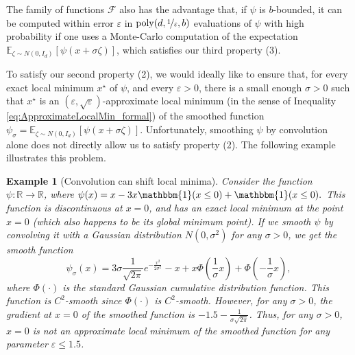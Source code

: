 \documentclass[11pt,letterpaper]{article}
\renewcommand{\epsilon}{\varepsilon}
\newtheorem{example}[theorem]{Example}
\newcommand{\eps}{\varepsilon}
\begin{document}
The family of functions $\mathcal{F}$ also has the advantage that, if $\psi$ is $b$-bounded, it can be computed within error $\epsilon$ in $\mathrm{poly}(d,\nicefrac{1}{\epsilon}, b)$ evaluations of $\psi$ with high probability if one uses a Monte-Carlo computation of the expectation $\mathbb{E}_{\zeta \sim N(0,I_d)}\left [\psi(x  + \sigma \zeta)\right]$, which satisfies our third property (3).
  

To satisfy our second property (2), we would ideally like to ensure that, for every exact local minimum $x^\star$ of $\psi$, and every $\epsilon>0$, there is a small enough $\sigma>0$  such that $x^\star$ is an  $(\epsilon, \sqrt{\eps})$-approximate local minimum (in the sense of Inequality \eqref{eq:ApproximateLocalMin_formal}) of the smoothed function $\psi_{\sigma} = \mathbb{E}_{\zeta \sim N(0,I_d)}\left [\psi(x  + \sigma \zeta) \right]$. 
%
 Unfortunately, smoothing $\psi$ by convolution alone does not directly allow us to satisfy property (2). The following example illustrates this problem.
\begin{example}[Convolution can shift local minima] \label{ex_shifted_min1}
Consider the function $\psi: \mathbb{R} \rightarrow \mathbb{R}$, where
%
%
 $   \psi(x)    = x - 3x \mathbbm{1}(x\leq 0) + \mathbbm{1}(x \leq 0).$
   This function is discontinuous at $x=0$, and has an exact local minimum at the point $x=0$ (which also happens to be its global minimum point). 
    If we smooth $\psi$ by convolving it with a Gaussian distribution $N(0,\sigma^2)$ for any $\sigma>0$,  we get the smooth function 
    \begin{equation*}
        \psi_\sigma(x) = 3 \sigma \frac{1}{\sqrt{2\pi}} e^{-\frac{x^2}{2 \sigma^2}} - x + x \Phi\left(\frac{1}{\sigma} x\right) + \Phi\left(-\frac{1}{\sigma} x\right),
         \end{equation*}
        where $\Phi(\cdot)$ is the standard Gaussian cumulative distribution function. 
    This function is $C^{2}$-smooth since $\Phi(\cdot)$ is $C^{2}$-smooth. 
    However, for any $\sigma >0$, the gradient at $x=0$ of the smoothed function is $-1.5 - \frac{1}{\sigma \sqrt{2 \pi}}$. 
     Thus, for any $\sigma>0$, $x=0$ is not an approximate local minimum of the smoothed function for any parameter $\epsilon \leq 1.5$.
\end{example}
%
\end{document}
